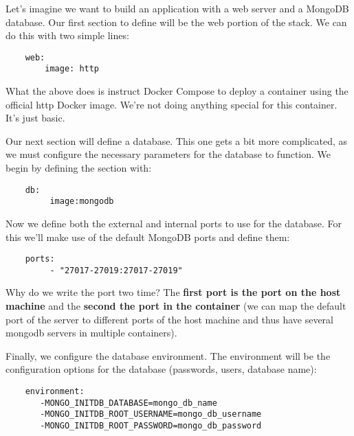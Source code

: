 \documentclass[handout]{beamer}[10pt, usepdftitle=false]
\begin{document}
	\begin{frame}[fragile]
	
	Let's imagine we want to build an application with a web server and a MongoDB database.
    Our first section to define will be the web portion of the stack. We can do this with two simple lines: 
    
    \begin{verbatim}
	web:
	    image: http 
    \end{verbatim}    
    
	What the above does is instruct Docker Compose to deploy a container using the official http Docker image. We're not doing anything special for this container. It's just basic. 
	\vspace*{0.6em}
       
Our next section will define a database. This one gets a bit more complicated, as we must configure the necessary parameters for the database to function. We begin by defining the section with:
\vspace*{0.6em}

	\begin{verbatim}
	db:
	     image:mongodb
	\end{verbatim}
		
	\end{frame}
	\begin{frame}[fragile]	
	
	Now we define both the external and internal ports to use for the database. For this we'll make use of the default MongoDB ports and define them: 
	\vspace*{0.6em}
	
	\begin{verbatim}
	ports:
	     - "27017-27019:27017-27019"
	\end{verbatim}
	
Why do we write the port two time?
The \textbf{first port is the port on the host machine} and the \textbf{second the port in the container} (we can map the default port of the server to different ports of the host machine and thus have several mongodb servers in multiple containers).
\vspace*{0.6em}

Finally, we configure the database environment. The environment will be the configuration options for the database (passwords, users, database name):
\vspace*{0.6em}

	\begin{verbatim}
	environment:
 	   -MONGO_INITDB_DATABASE=mongo_db_name
 	   -MONGO_INITDB_ROOT_USERNAME=mongo_db_username  
 	   -MONGO_INITDB_ROOT_PASSWORD=mongo_db_password
	\end{verbatim}
	
	
	\end{frame}
\end{document}
